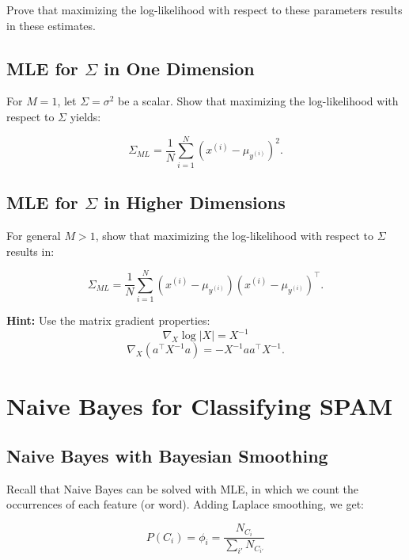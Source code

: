 \documentclass[lang=cn,11pt]{elegantbook}
\begin{document}
Prove that maximizing the log-likelihood with respect to these parameters results in these estimates.

\subsection{MLE for $\Sigma$ in One Dimension}

For $M=1$, let $\Sigma = \sigma^2$ be a scalar. Show that maximizing the log-likelihood with respect to $\Sigma$ yields:

\begin{equation}
    \Sigma_{ML} = \frac{1}{N} \sum_{i=1}^{N} (x^{(i)} - \mu_{y^{(i)}})^2.
\end{equation}

\subsection{MLE for $\Sigma$ in Higher Dimensions}

For general $M > 1$, show that maximizing the log-likelihood with respect to $\Sigma$ results in:

\begin{equation}
    \Sigma_{ML} = \frac{1}{N} \sum_{i=1}^{N} (x^{(i)} - \mu_{y^{(i)}})(x^{(i)} - \mu_{y^{(i)}})^\top.
\end{equation}

\textbf{Hint:} Use the matrix gradient properties:
\begin{equation}
    \nabla_X \log |X| = X^{-1}
\end{equation}
\begin{equation}
    \nabla_X (a^\top X^{-1} a) = -X^{-1} a a^\top X^{-1}.
\end{equation}



\section{Naive Bayes for Classifying SPAM}

\subsection{Naive Bayes with Bayesian Smoothing}

Recall that Naive Bayes can be solved with MLE, in which we count the occurrences of each feature (or word). Adding Laplace smoothing, we get:

\begin{equation}
    P(C_i) = \phi_i = \frac{N_{C_i}}{\sum_{i'} N_{C_{i'}}}
\end{equation}
\end{document}
